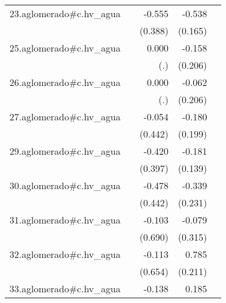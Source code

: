 {\begin{longtable}{l*{4}{D{.}{.}{-1}}}
\addlinespace
23.aglomerado#c.hv\_agua&                     &      -0.555         &      -0.538\sym{**} &                     \\
            &                     &     (0.388)         &     (0.165)         &                     \\
\addlinespace
25.aglomerado#c.hv\_agua&                     &       0.000         &      -0.158         &                     \\
            &                     &         (.)         &     (0.206)         &                     \\
\addlinespace
26.aglomerado#c.hv\_agua&                     &       0.000         &      -0.062         &                     \\
            &                     &         (.)         &     (0.206)         &                     \\
\addlinespace
27.aglomerado#c.hv\_agua&                     &      -0.054         &      -0.180         &                     \\
            &                     &     (0.442)         &     (0.199)         &                     \\
\addlinespace
29.aglomerado#c.hv\_agua&                     &      -0.420         &      -0.181         &                     \\
            &                     &     (0.397)         &     (0.139)         &                     \\
\addlinespace
30.aglomerado#c.hv\_agua&                     &      -0.478         &      -0.339         &                     \\
            &                     &     (0.442)         &     (0.231)         &                     \\
\addlinespace
31.aglomerado#c.hv\_agua&                     &      -0.103         &      -0.079         &                     \\
            &                     &     (0.690)         &     (0.315)         &                     \\
\addlinespace
32.aglomerado#c.hv\_agua&                     &      -0.113         &       0.785\sym{***}&                     \\
            &                     &     (0.654)         &     (0.211)         &                     \\
\addlinespace
33.aglomerado#c.hv\_agua&                     &      -0.138         &       0.185\sym{**} &                     \\

\end{longtable}}
